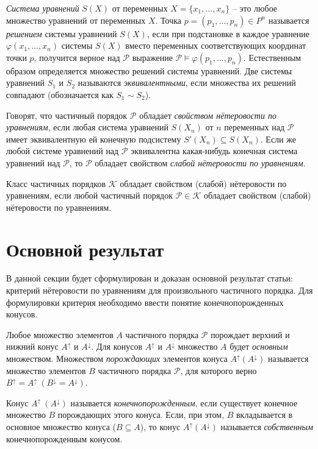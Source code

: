 \documentclass[12pt]{article}
\theoremstyle{break}
\def\P{\mathcal{P}}
\begin{document}
		\textit{Система уравнений} $S(X)$ от переменных $X=\{x_1,\dots,x_n\}$ -- это любое множество уравнений от переменных $X$. Точка $p=(p_1,\dots,p_n)\in P^n$ называется \textit{решением} системы уравнений $S(X)$, если при подстановке в каждое уравнение $\varphi(x_1,\dots,x_n)$ системы $S(X)$ вместо переменных соответствующих координат точки $p$, получится верное над $\P$ выражение $\P\vDash \varphi(p_1,\dots,p_n)$. Естественным образом определяется множество решений системы уравнений. Две системы уравнений $S_1$ и $S_2$ называются \textit{эквивалентными}, если множества их решений совпадают (обозначается как $S_1\sim S_2$).
		
		
		Говорят, что частичный порядок $\P$ обладает \textit{свойством нётеровости по уравнениям}, если любая система уравнений $S(X_n)$ от $n$ переменных над $\P$ имеет эквивалентную ей конечную подсистему $S'(X_n) \subseteq S(X_n)$. Если же любой системе уравнений над $\P$ эквивалентна какая-нибудь конечная система уравнений над $\P$, то $\P$ обладает свойством \textit{слабой нётеровости по уравнениям}.
		
		Класс частичных порядков $\mathcal{K}$ обладает свойством (слабой) нётеровости по уравнениям, если любой частичный порядок $\P \in \mathcal{K}$ обладает свойством (слабой) нётеровости по уравнениям.
		
	
	\section{Основной результат}
		В данной секции будет сформулирован и доказан основной результат статьи: критерий нётеровости по уравнениям для произвольного частичного порядка. Для формулировки критерия необходимо ввести понятие конечнопорожденных конусов.

		Любое множество элементов $A$ частичного порядка $\P$ порождает верхний и нижний конус $A^{\uparrow}$ и $A^{\downarrow}$. Для конусов $A^{\uparrow}$ и $A^{\downarrow}$ множество $A$ будет \textit{основным} множеством. Множеством \textit{порождающих} элементов конуса $A^{\uparrow}(A^{\downarrow})$ называется множество элементов $B$ частичного порядка $\P$, для которого верно $B^{\uparrow}=A^{\uparrow}~(B^{\downarrow}=A^{\downarrow})$.

		Конус $A^{\uparrow}~(A^{\downarrow})$ называется \textit{конечнопорожденным}, если существует конечное множество $B$ порождающих этого конуса. Если, при этом, $B$ вкладывается в основное множество конуса ($B\subseteq A$), то конус $A^{\uparrow}(A^{\downarrow})$ называется \textit{собственным} конечнопорожденным конусом.
\end{document}

